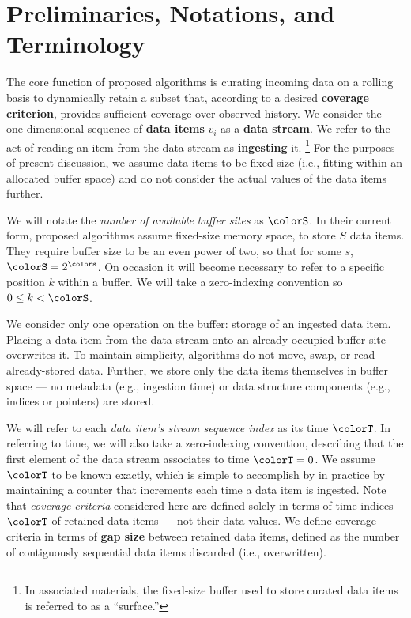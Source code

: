 \section{Preliminaries, Notations, and Terminology} \label{sec:notation}

The core function of proposed algorithms is curating incoming data on a rolling basis to dynamically retain a subset that, according to a desired \textbf{coverage criterion}, provides sufficient coverage over observed history.
We consider the one-dimensional sequence of \textbf{data items} $v_i$ as a \textbf{data stream}.
We refer to the act of reading an item from the data stream as \textbf{ingesting} it.%
\footnote{%
In associated materials, the fixed-size buffer used to store curated data items is referred to as a ``surface.''%
}
For the purposes of present discussion, we assume data items to be fixed-size (i.e., fitting within an allocated buffer space) and do not consider the actual values of the data items further.

We will notate the \textit{number of available buffer sites} as $\colorS$.
In their current form, proposed algorithms assume fixed-size memory space, to store $S$ data items.
They require buffer size to be an even power of two, so that for some $s$, $\colorS = 2^{\colors}$.
On occasion it will become necessary to refer to a specific position $k$ within a buffer.
We will take a zero-indexing convention so $0 \leq k < \colorS$.

We consider only one operation on the buffer: storage of an ingested data item.
Placing a data item from the data stream onto an already-occupied buffer site overwrites it.
To maintain simplicity, algorithms do not move, swap, or read already-stored data.
Further, we store only the data items themselves in buffer space --- no metadata (e.g., ingestion time) or data structure components (e.g., indices or pointers) are stored.

We will refer to each \textit{data item's stream sequence index} as its time $\colorT$.
In referring to time, we will also take a zero-indexing convention, describing that the first element of the data stream associates to time $\colorT=0$.
We assume $\colorT$ to be known exactly, which is simple to accomplish by in practice by maintaining a counter that increments each time a data item is ingested.
Note that \textit{coverage criteria} considered here are defined solely in terms of time indices $\colorT$ of retained data items --- not their data values.
We define coverage criteria in terms of \textbf{gap size} between retained data items, defined as the number of contiguously sequential data items discarded (i.e., overwritten).

